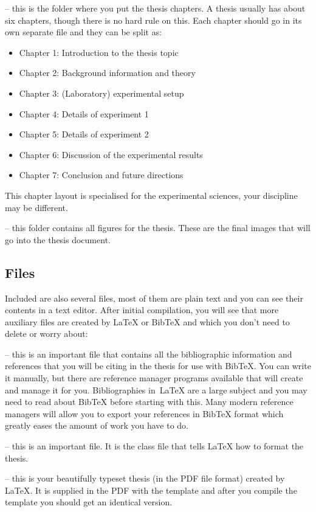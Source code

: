  -- this is the folder where you put the thesis chapters. A thesis usually has about six chapters, though there is no hard rule on this. Each chapter should go in its own separate  file and they can be split as:
\begin{itemize}
	\item Chapter 1: Introduction to the thesis topic
	\item Chapter 2: Background information and theory
	\item Chapter 3: (Laboratory) experimental setup
	\item Chapter 4: Details of experiment 1
	\item Chapter 5: Details of experiment 2
	\item Chapter 6: Discussion of the experimental results
	\item Chapter 7: Conclusion and future directions
\end{itemize}
This chapter layout is specialised for the experimental sciences, your discipline may be different.

 -- this folder contains all figures for the thesis. These are the final images that will go into the thesis document.

\subsection{Files}

Included are also several files, most of them are plain text and you can see their contents in a text editor. After initial compilation, you will see that more auxiliary files are created by \LaTeX{} or BibTeX and which you don't need to delete or worry about:

 -- this is an important file that contains all the bibliographic information and references that you will be citing in the thesis for use with BibTeX. You can write it manually, but there are reference manager programs available that will create and manage it for you. Bibliographies in~\LaTeX{} are a large subject and you may need to read about BibTeX before starting with this. Many modern reference managers will allow you to export your references in BibTeX format which greatly eases the amount of work you have to do.

 -- this is an important file. It is the class file that tells \LaTeX{} how to format the thesis.

 -- this is your beautifully typeset thesis (in the PDF file format) created by \LaTeX{}. It is supplied in the PDF with the template and after you compile the template you should get an identical version.

